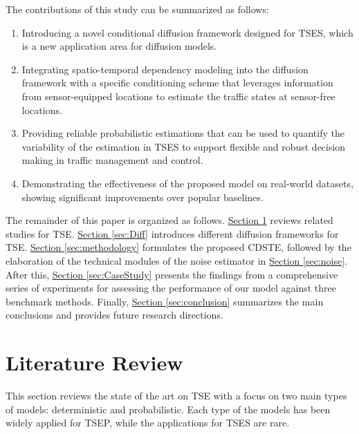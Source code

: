 \documentclass[a4paper,fleqn,12pt]{cas-sc}
\newcommand{\rev}[1]{{\color{red} #1}}
\begin{document}
\rev{The contributions of this study can be summarized as follows:
\begin{enumerate}
    \item Introducing a novel conditional diffusion framework designed for TSES, which is a new application area for diffusion models.
    \item Integrating spatio-temporal dependency modeling into the diffusion framework with a specific conditioning scheme that leverages information from sensor-equipped locations to estimate the traffic states at sensor-free locations.
    \item Providing reliable probabilistic estimations that can be used to quantify the variability of the estimation in TSES to support flexible and robust decision making in traffic management and control.
    \item Demonstrating the effectiveness of the proposed model on real-world datasets, showing significant improvements over popular baselines.
\end{enumerate}
}

The remainder of this paper is organized as follows. \hyperref[sec:liter]{Section \ref{sec:liter}} reviews related studies for TSE. \hyperref[sec:Diff]{Section \ref{sec:Diff}} introduces different diffusion frameworks for TSE. \hyperref[sec:methodology]{Section \ref{sec:methodology}} formulates the proposed CDSTE, followed by the elaboration of the technical modules of the noise estimator in \hyperref[sec:noise]{Section \ref{sec:noise}}. After this, \hyperref[sec:CaseStudy]{Section \ref{sec:CaseStudy}} presents the findings from a comprehensive series of experiments for assessing the performance of our model against three benchmark methods. Finally, \hyperref[sec:conclusion]{Section \ref{sec:conclusion}} summarizes the main conclusions and provides future research directions.

\section{Literature Review}\label{sec:liter}
This section reviews the state of the art on TSE with a focus on two main types of models: deterministic and probabilistic. Each type of the models has been widely applied for TSEP, while the applications for TSES are rare.
\end{document}
